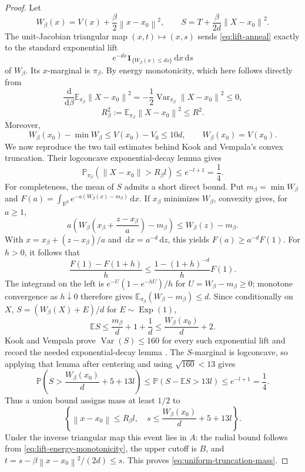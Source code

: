 \documentclass[11pt]{article}
\theoremstyle{remark}
\newcommand{\R}{\mathbb R}
\newcommand{\E}{\mathbb E}
\newcommand{\Pp}{\mathbb P}
\newcommand{\1}{\bm 1}
\newcommand{\Var}{\operatorname{Var}}
\newcommand{\dd}{\,\mathrm d}
\newcommand{\norm}[1]{\left\lVert #1\right\rVert}
\begin{document}
\begin{proof}
Let
\[
  W_\beta(x)=V(x)+\frac\beta2\norm{x-x_0}^2,
  \qquad
  S=T+\frac{\beta}{2d}\norm{X-x_0}^2.
\]
The unit-Jacobian triangular map $(x,t)\mapsto(x,s)$ sends
\eqref{eq:lift-anneal} exactly to the standard exponential lift
\[
  e^{-ds}\1_{\{W_\beta(x)\leq ds\}}\dd x\dd s
\]
of $W_\beta$.  Its $x$-marginal is $\pi_\beta$.  By energy monotonicity,
which here follows directly from
\[
  \frac{\dd}{\dd\beta}\E_{\pi_\beta}\norm{X-x_0}^2
  =-\frac12\Var_{\pi_\beta}\norm{X-x_0}^2\leq0,
\]
\begin{equation}\label{eq:lift-energy-monotonicity}
  R_\beta^2:=\E_{\pi_\beta}\norm{X-x_0}^2\leq R^2.
\end{equation}
Moreover,
\[
  W_\beta(x_0)-\min W_\beta
  \leq V(x_0)-V_0\leq10d,
  \qquad W_\beta(x_0)=V(x_0).
\]
We now reproduce the two tail estimates behind Kook and Vempala's
convex truncation.  Their logconcave exponential-decay lemma
\citep[Lemma~A.7]{KV25sampling} gives
\begin{equation}\label{eq:uniform-truncation-radial-tail}
  \Pp_{\pi_\beta}\!\left(\norm{X-x_0}>R_\beta l\right)
  \leq e^{-l+1}=\frac14.
\end{equation}
For completeness, the mean of $S$ admits a short direct bound.  Put
$m_\beta=\min W_\beta$ and
$F(a)=\int_{\R^d}e^{-a(W_\beta(x)-m_\beta)}\dd x$.  If $x_\beta$
minimizes $W_\beta$, convexity gives, for $a\geq1$,
\[
  a\left(W_\beta\!\left(x_\beta+
    \frac{z-x_\beta}{a}\right)-m_\beta\right)
  \leq W_\beta(z)-m_\beta.
\]
With $x=x_\beta+(z-x_\beta)/a$ and
$\dd x=a^{-d}\dd z$, this yields
$F(a)\geq a^{-d}F(1)$.  For $h>0$, it follows that
\[
  \frac{F(1)-F(1+h)}h
  \leq\frac{1-(1+h)^{-d}}hF(1).
\]
The integrand on the left is
$e^{-U}(1-e^{-hU})/h$ for $U=W_\beta-m_\beta\geq0$; monotone
convergence as $h\downarrow0$ therefore gives
$\E_{\pi_\beta}(W_\beta-m_\beta)\leq d$.  Since conditionally on $X$,
$S=(W_\beta(X)+E)/d$ for $E\sim\operatorname{Exp}(1)$,
\begin{equation}\label{eq:uniform-truncation-lift-mean}
  \E S\leq\frac{m_\beta}{d}+1+\frac1d
  \leq\frac{W_\beta(x_0)}d+2.
\end{equation}
Kook and Vempala prove $\Var(S)\leq160$ for every such exponential
lift and record the needed exponential-decay lemma
\citep[Lemmas~2.5 and~A.7]{KV25sampling}.  The $S$-marginal is
logconcave, so applying that lemma after centering and using
$\sqrt{160}<13$ gives
\begin{equation}\label{eq:uniform-truncation-lift-tail}
  \Pp\!\left(S>\frac{W_\beta(x_0)}d+5+13l\right)
  \leq\Pp(S-\E S>13l)
  \leq e^{-l+1}=\frac14.
\end{equation}
Thus a union bound assigns mass at least $1/2$ to
\[
  \left\{\norm{x-x_0}\leq R_\beta l,\quad
  s\leq\frac{W_\beta(x_0)}d+5+13l\right\}.
\]
Under the inverse triangular map this event lies in $A$: the radial
bound follows from \eqref{eq:lift-energy-monotonicity}, the upper cutoff
is $B$, and
$t=s-\beta\norm{x-x_0}^2/(2d)\leq s$.  This proves
\eqref{eq:uniform-truncation-mass}.
\end{proof}
\end{document}
